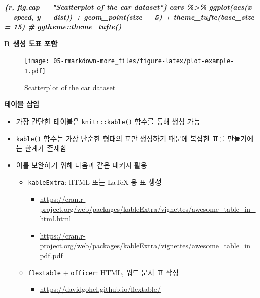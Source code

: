 \documentclass[
  11pt,
]{krantz}
\newenvironment{Shaded}{\begin{snugshade}}{\end{snugshade}}
\newcommand{\InformationTok}[1]{\textcolor[rgb]{0.37,0.37,0.37}{\textbf{\textit{#1}}}}
\providecommand{\tightlist}{%
  \setlength{\itemsep}{0pt}\setlength{\parskip}{0pt}}
\begin{document}
\normalsize

\begin{Shaded}
\begin{Highlighting}[]
\InformationTok{\textasciigrave{}\textasciigrave{}\textasciigrave{}\{r, fig.cap = "Scatterplot of the car dataset"\}}
\InformationTok{cars \%\textgreater{}\%}
\InformationTok{   ggplot(aes(x = speed, y = dist)) +}
\InformationTok{   geom\_point(size = 5) +}
\InformationTok{   theme\_tufte(base\_size = 15) \# ggtheme::theme\_tufte()}
\InformationTok{\textasciigrave{}\textasciigrave{}\textasciigrave{}}
\end{Highlighting}
\end{Shaded}

\textbf{R 생성 도표 포함}

\footnotesize

\begin{figure}
\centering
\texttt{[image: 05-rmarkdown-more\_files/figure-latex/plot-example-1.pdf]}
\caption{\label{fig:plot-example}Scatterplot of the car dataset}
\end{figure}

\normalsize

\textbf{테이블 삽입}

\begin{itemize}
\tightlist
\item
  가장 간단한 테이블은 \texttt{knitr::kable()} 함수를 통해 생성 가능
\item
  \texttt{kable()} 함수는 가장 단순한 형태의 표만 생성하기 때문에 복잡한 표를 만들기에는 한계가 존재함
\item
  이를 보완하기 위해 다음과 같은 패키지 활용

  \begin{itemize}
  \tightlist
  \item
    \texttt{kableExtra}: HTML 또는 LaTeX 용 표 생성

    \begin{itemize}
    \tightlist
    \item
      \url{https://cran.r-project.org/web/packages/kableExtra/vignettes/awesome_table_in_html.html}
    \item
      \url{https://cran.r-project.org/web/packages/kableExtra/vignettes/awesome_table_in_pdf.pdf}
    \end{itemize}
  \item
    \texttt{flextable} + \texttt{officer}: HTML, 워드 문서 표 작성

    \begin{itemize}
    \tightlist
    \item
      \url{https://davidgohel.github.io/flextable/}
    \end{itemize}
  \end{itemize}
\end{itemize}
\end{document}
